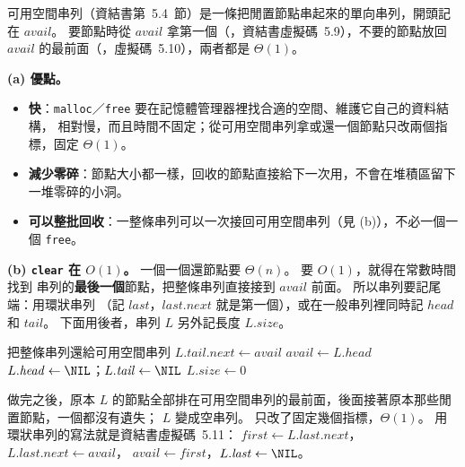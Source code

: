 \begin{pastsoln}
可用空間串列（資結書第~5.4~節）是一條把閒置節點串起來的單向串列，開頭記在 $\mathit{avail}$。
要節點時從 $\mathit{avail}$ 拿第一個（，資結書虛擬碼~5.9），不要的節點放回
$\mathit{avail}$ 的最前面（，虛擬碼~5.10），兩者都是 $\Theta(1)$。

\textbf{(a) 優點。}
\begin{itemize}
\item \textbf{快}：\texttt{malloc}／\texttt{free} 要在記憶體管理器裡找合適的空間、維護它自己的資料結構，
相對慢，而且時間不固定；從可用空間串列拿或還一個節點只改兩個指標，固定 $\Theta(1)$。
\item \textbf{減少零碎}：節點大小都一樣，回收的節點直接給下一次用，不會在堆積區留下一堆零碎的小洞。
\item \textbf{可以整批回收}：一整條串列可以一次接回可用空間串列（見 (b)），不必一個一個 \texttt{free}。
\end{itemize}

\textbf{(b) \texttt{clear} 在 $O(1)$。} 一個一個還節點要 $\Theta(n)$。 要 $O(1)$，就得在常數時間找到
串列的\textbf{最後一個}節點，把整條串列直接接到 $\mathit{avail}$ 前面。 所以串列要記尾端：用環狀串列
（記 $\mathit{last}$，$\mathit{last}.\mathit{next}$ 就是第一個），或在一般串列裡同時記 $\mathit{head}$
和 $\mathit{tail}$。 下面用後者，串列 $L$ 另外記長度 $L.\mathit{size}$。
\begin{pseudo}[unbreakable]{把整條串列還給可用空間串列}
        \State $L.\mathit{tail}.\mathit{next} \gets \mathit{avail}$ 
        \State $\mathit{avail} \gets L.\mathit{head}$ 
        \State $L.\mathit{head} \gets \NIL$；$L.\mathit{tail} \gets \NIL$
    \EndIf
    \State $L.\mathit{size} \gets 0$
\EndProcedure
\end{pseudo}
做完之後，原本 $L$ 的節點全部排在可用空間串列的最前面，後面接著原本那些閒置節點，一個都沒有遺失；
$L$ 變成空串列。 只改了固定幾個指標，$\Theta(1)$。 用環狀串列的寫法就是資結書虛擬碼~5.11：
$\mathit{first} \gets L.\mathit{last}.\mathit{next}$，$L.\mathit{last}.\mathit{next} \gets \mathit{avail}$，
$\mathit{avail} \gets \mathit{first}$，$L.\mathit{last} \gets \NIL$。


\end{pastsoln}
